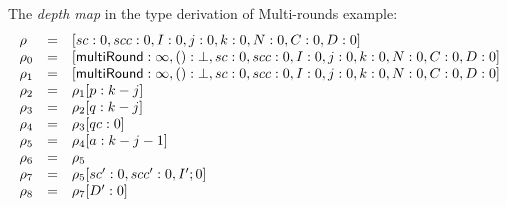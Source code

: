 \documentclass[a4paper,11pt]{article}
\theoremstyle{definition}
\begin{document}
The \emph{depth map} in the type derivation of Multi-rounds example:
\[
\begin{array}{lll}
\rho     & = & [sc : 0, scc : 0, I : 0, j : 0, k : 0, N : 0, C: 0, D : 0] \\
\rho_0   & = & [\mathsf{multiRound}: \infty, () : \bot, sc : 0, scc : 0, I : 0, j : 0, k : 0, N : 0, C: 0, D : 0] \\
\rho_1   & = & [\mathsf{multiRound}: \infty, () : \bot, sc : 0, scc : 0, I : 0, j : 0, k : 0, N : 0, C: 0, D : 0] \\
\rho_2   & = & \rho_1[p : k - j]\\
\rho_3   & = & \rho_2[q : k - j]\\
\rho_4   & = & \rho_3[qc : 0]\\
\rho_5   & = & \rho_4[a : k - j - 1]\\
\rho_6   & = & \rho_5\\
\rho_7   & = & \rho_5[sc' : 0, scc' : 0, I' ; 0]\\
\rho_8   & = & \rho_7[D' : 0]\\
\end{array}
\]


\newpage


\end{document}
